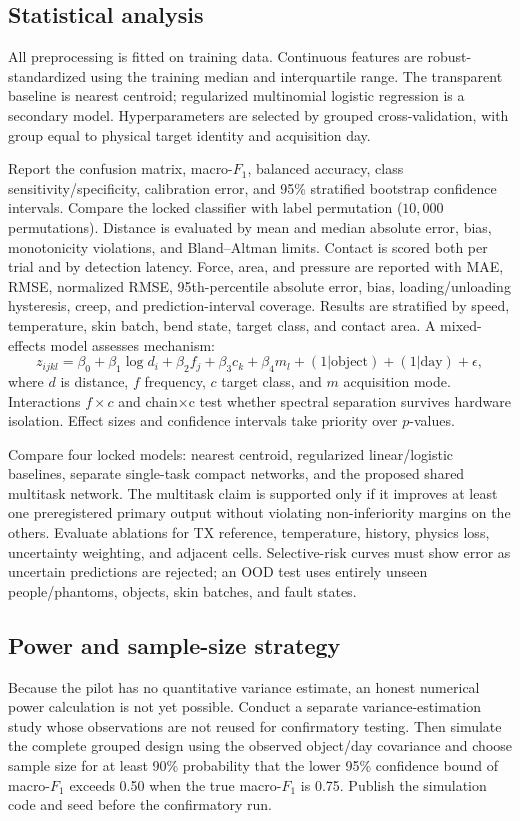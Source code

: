\documentclass[10pt]{article}
\begin{document}
\subsection{Statistical analysis}
All preprocessing is fitted on training data. Continuous features are robust-standardized using the training median and interquartile range. The transparent baseline is nearest centroid; regularized multinomial logistic regression is a secondary model. Hyperparameters are selected by grouped cross-validation, with group equal to physical target identity and acquisition day.

Report the confusion matrix, macro-$F_1$, balanced accuracy, class sensitivity/specificity, calibration error, and 95\% stratified bootstrap confidence intervals. Compare the locked classifier with label permutation ($10{,}000$ permutations). Distance is evaluated by mean and median absolute error, bias, monotonicity violations, and Bland--Altman limits. Contact is scored both per trial and by detection latency. Force, area, and pressure are reported with MAE, RMSE, normalized RMSE, 95th-percentile absolute error, bias, loading/unloading hysteresis, creep, and prediction-interval coverage. Results are stratified by speed, temperature, skin batch, bend state, target class, and contact area. A mixed-effects model assesses mechanism:
\begin{equation}
z_{ijkl}=\beta_0+\beta_1\log d_i+\beta_2 f_j+\beta_3 c_k+\beta_4 m_l+(1|\text{object})+(1|\text{day})+\epsilon,
\end{equation}
where $d$ is distance, $f$ frequency, $c$ target class, and $m$ acquisition mode. Interactions $f\times c$ and chain$\times$c test whether spectral separation survives hardware isolation. Effect sizes and confidence intervals take priority over $p$-values.

Compare four locked models: nearest centroid, regularized linear/logistic baselines, separate single-task compact networks, and the proposed shared multitask network. The multitask claim is supported only if it improves at least one preregistered primary output without violating non-inferiority margins on the others. Evaluate ablations for TX reference, temperature, history, physics loss, uncertainty weighting, and adjacent cells. Selective-risk curves must show error as uncertain predictions are rejected; an OOD test uses entirely unseen people/phantoms, objects, skin batches, and fault states.

\subsection{Power and sample-size strategy}
Because the pilot has no quantitative variance estimate, an honest numerical power calculation is not yet possible. Conduct a separate variance-estimation study whose observations are not reused for confirmatory testing. Then simulate the complete grouped design using the observed object/day covariance and choose sample size for at least 90\% probability that the lower 95\% confidence bound of macro-$F_1$ exceeds 0.50 when the true macro-$F_1$ is 0.75. Publish the simulation code and seed before the confirmatory run.
\end{document}
